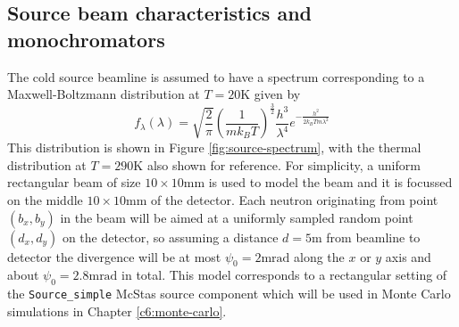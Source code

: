 \documentclass{article}
\begin{document}
\subsection{Source beam characteristics and monochromators}
\label{c3.2}
The cold source beamline is assumed to have a spectrum corresponding to a Maxwell-Boltzmann distribution at $T = 20 \unit{\kelvin}$ given by 
\begin{equation}
	f_\lambda(\lambda) = \sqrt{\frac{2}{\pi}}\left(\frac{1}{mk_BT}\right)^{\frac{3}{2}}\frac{h^3}{\lambda^4}e^{-\frac{h^2}{2k_BTm\lambda^2}} \label{eq:cold-source-spectrum}
\end{equation}
This distribution is shown in Figure \ref{fig:source-spectrum}, with the thermal distribution at $T=290 \unit{\kelvin}$ also shown for reference. For simplicity, a uniform rectangular beam of size $10\times10\unit{\milli\meter}$ is used to model the beam and it is focussed on the middle $10\times10\unit{\milli\meter}$ of the detector. Each neutron originating from point $(b_x,b_y)$ in the beam will be aimed at a uniformly sampled random point $(d_x, d_y)$ on the detector, so assuming a distance $d = 5\unit\meter$ from beamline to detector the divergence will be at most $\psi_0 = 2\unit{\milli\radian}$ along the $x$ or $y$ axis and about $\psi_0 = 2.8\unit{\milli\radian}$ in total. This model corresponds to a rectangular setting of the \texttt{Source\_simple} McStas source component which will be used in Monte Carlo simulations in Chapter \ref{c6:monte-carlo}.  

\end{document}
